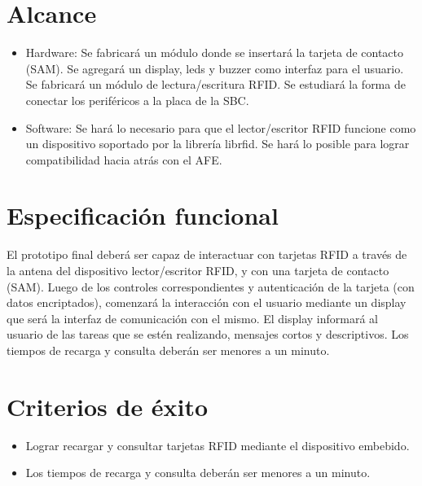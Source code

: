 \section{Alcance}

\begin{itemize}

\item Hardware: Se fabricar\'a un m\'odulo donde se insertar\'a la tarjeta de contacto (SAM).
Se agregar\'a un display, leds y buzzer como interfaz para el usuario. Se fabricar\'a un m\'odulo de lectura/escritura RFID. Se estudiar\'a la forma de conectar los perif\'ericos a la placa de la SBC.

\item Software: Se har\'a lo necesario para que el lector/escritor RFID funcione como un dispositivo soportado por la librer\'ia librfid. Se hará lo posible para lograr compatibilidad hacia atrás con el AFE.
    
\end{itemize}

\section{Especificaci\'on funcional}

El prototipo final deber\'a ser capaz de interactuar con tarjetas RFID a trav\'es de la antena del dispositivo lector/escritor RFID, y con una tarjeta de contacto (SAM). Luego de los controles correspondientes y autenticaci\'on de la tarjeta (con datos encriptados), comenzar\'a la interacci\'on con el usuario mediante un display que ser\'a la interfaz de comunicaci\'on con el mismo. El display informar\'a al usuario de las tareas que se est\'en realizando, mensajes cortos y descriptivos. Los tiempos de recarga y consulta deber\'an ser menores a un minuto.

\section{Criterios de \'exito}

\begin{itemize}

\item Lograr recargar y consultar tarjetas RFID mediante el dispositivo embebido.

\item Los tiempos de recarga y consulta deber\'an ser menores a un minuto.

\end{itemize}